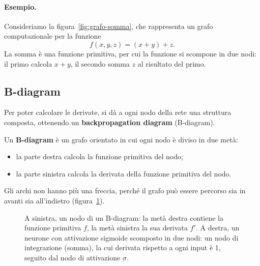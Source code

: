 \paragraph{Esempio.}
Consideriamo la figura~\ref{fig:grafo-somma}, che rappresenta un grafo computazionale per la funzione
\[
f(x, y, z) = (x + y) + z.
\]
La somma è una funzione primitiva, per cui la funzione si scompone in due nodi: il primo calcola $x + y$, il secondo somma $z$ al risultato del primo.

\subsection{B-diagram}
Per poter calcolare le derivate, si dà a ogni nodo della rete una struttura composta, ottenendo un \textbf{backpropagation diagram} (B-diagram). 
\begin{definizione}[B-diagram]
  Un \textbf{B-diagram} è un grafo orientato in cui ogni nodo è diviso in due metà: \begin{itemize}
    \item la parte destra calcola la funzione primitiva del nodo;
    \item la parte sinistra calcola la derivata della funzione primitiva del nodo.
  \end{itemize}
\end{definizione}

Gli archi non hanno più una freccia, perché il grafo può essere percorso sia in avanti sia all'indietro (figura~\ref{fig:bnode}).

\begin{figure}[htbp]
\centering
{}
\hspace{1.5cm}
\caption{A sinistra, un nodo di un B-diagram: la metà destra contiene la funzione primitiva $f$, la metà sinistra la sua derivata $f'$. A destra, un neurone con attivazione sigmoide scomposto in due nodi: un nodo di integrazione (somma), la cui derivata rispetto a ogni input è 1, seguito dal nodo di attivazione $\sigma$.}
\label{fig:bnode}
\end{figure}

